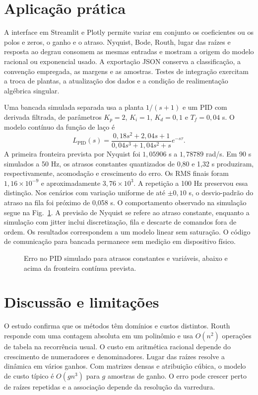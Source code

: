 \section{Aplicação prática}
A interface em Streamlit e Plotly permite variar em conjunto
os coeficientes ou os polos e zeros, o ganho e o atraso.
Nyquist, Bode, Routh, lugar das raízes e resposta ao degrau
consomem as mesmas entradas e mostram a origem do modelo
racional ou exponencial usado. A exportação JSON conserva
a classificação, a convenção empregada, as margens e as amostras.
Testes de integração exercitam a troca de plantas, a atualização
dos dados e a condição de realimentação algébrica singular.

Uma bancada simulada separada usa a planta $1/(s+1)$ e um PID
com derivada filtrada, de parâmetros $K_p=2$, $K_i=1$,
$K_d=0{,}1$ e $T_f=0{,}04$ s. O modelo contínuo da função de
laço é
\begin{equation}
L_{\mathrm{PID}}(s)=
\frac{0{,}18s^2+2{,}04s+1}{0{,}04s^3+1{,}04s^2+s}e^{-s\tau}.
\end{equation}
A primeira fronteira prevista por Nyquist foi $1{,}05906$ s a
$1{,}78789$ rad/s. Em 90 s simulados a 50 Hz, os atrasos
constantes quantizados de 0,80 e 1,32 s produziram, respectivamente,
acomodação e crescimento do erro. Os RMS finais foram
$1{,}16\times10^{-9}$ e aproximadamente $3{,}76\times10^3$.
A repetição a 100 Hz preservou essa distinção. Nos cenários
com variação uniforme de até $\pm0{,}10$ s, o desvio-padrão
do atraso na fila foi próximo de 0,058 s. O comportamento
observado na simulação segue na Fig.~\ref{fig:hil}. A previsão
de Nyquist se refere ao atraso constante, enquanto a simulação
com jitter inclui discretização, fila e descarte de comandos
fora de ordem. Os resultados correspondem a um modelo linear
sem saturação. O código de comunicação para bancada permanece
sem medição em dispositivo físico.

\begin{figure}[!t]
\centering
{}
\caption{Erro no PID simulado para atrasos constantes e variáveis,
abaixo e acima da fronteira contínua prevista.}
\label{fig:hil}
\end{figure}

\section{Discussão e limitações}
O estudo confirma que os métodos têm domínios e custos distintos.
Routh responde com uma contagem absoluta em um polinômio e usa
$O(n^2)$ operações de tabela na recorrência usual. O custo em
aritmética racional depende do crescimento de numeradores e
denominadores. Lugar das raízes resolve a dinâmica em vários
ganhos. Com matrizes densas e atribuição cúbica, o modelo de
custo típico é $O(gn^3)$ para $g$ amostras de ganho. O erro
pode crescer perto de raízes repetidas e a associação depende
da resolução da varredura.

